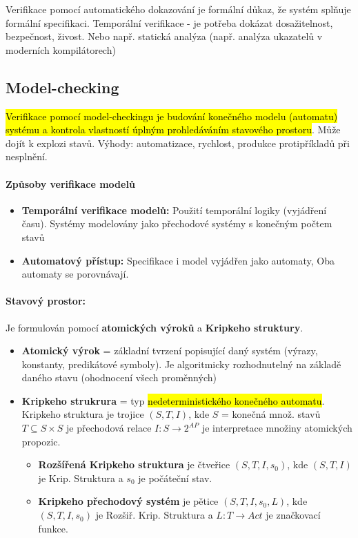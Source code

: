 Verifikace pomocí automatického dokazování je formální důkaz, že systém splňuje formální specifikaci. Temporální verifikace - je potřeba dokázat dosažitelnost, bezpečnost, živost. Nebo např. statická analýza (např. analýza ukazatelů v moderních kompilátorech)

\subsection{Model-checking}
\hl{Verifikace pomocí model-checkingu je budování konečného modelu (automatu) systému a kontrola vlastností úplným prohledáváním stavového prostoru}. Může dojít k explozi stavů. Výhody: automatizace, rychlost, produkce protipříkladů při nesplnění.

\paragraph{Způsoby verifikace modelů}

\begin{itemize}[itemsep=0px]
\item \textbf{Temporální verifikace modelů:} Použití temporální logiky (vyjádření času). Systémy modelovány jako přechodové systémy s konečným počtem stavů
\item \textbf{Automatový přístup:} Specifikace i model vyjádřen jako automaty, Oba automaty se porovnávají.
\end{itemize}

\paragraph{Stavový prostor:} Je formulován pomocí \textbf{atomických výroků} a \textbf{Kripkeho struktury}.

\begin{itemize}[itemsep=0px]
\item \textbf{Atomický výrok} = základní tvrzení popisující daný systém (výrazy, konstanty, predikátové symboly). Je algoritmicky rozhodnutelný na základě daného stavu (ohodnocení všech proměnných)
\item \textbf{Kripkeho strukrura} = typ \hl{nedeterministického konečného automatu}. Kripkeho struktura je trojice $(S, T, I)$, kde $S$ = konečná množ. stavů $T \subseteq S\times S$ je přechodová relace $I: S \rightarrow 2^{AP}$ je interpretace množiny atomických propozic.
    \begin{itemize}[itemsep=0px]
    \item \textbf{Rozšířená Kripkeho struktura} je čtveřice $(S, T, I, s_0)$, kde $(S, T, I)$ je Krip. Struktura a $s_0$ je počáteční stav.
    \item \textbf{Kripkeho přechodový systém} je pětice $(S, T, I, s_0, L)$, kde $(S, T, I, s_0)$ je Rozšiř. Krip. Struktura a $L: T \rightarrow Act$ je značkovací funkce.
    \end{itemize}
\end{itemize}

